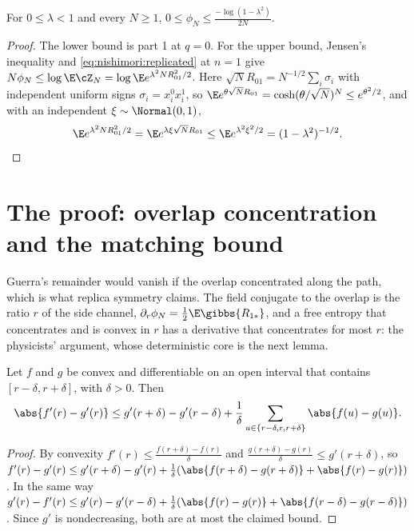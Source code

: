 \begin{refsection}
\begin{proposition}\label{prop:nishimori:below}
For $0\le\lambda<1$ and every $N\ge1$, $\displaystyle0\le\phi_N\le\frac{-\log(1-\lambda^2)}{2N}$.
\end{proposition}

\begin{proof}
The lower bound is part 1 at $q=0$. For the upper bound, Jensen's inequality and \eqref{eq:nishimori:replicated} at $n=1$ give $N\phi_N\le\log\E\cZ_N=\log\E e^{\lambda^2NR_{01}^2/2}$. Here $\sqrt NR_{01}=N^{-1/2}\sum_i\sigma_i$ with independent uniform signs $\sigma_i=x^0_ix^1_i$, so $\E e^{\theta\sqrt NR_{01}}=\cosh(\theta/\sqrt N)^N\le e^{\theta^2/2}$, and with an independent $\xi\sim\Normal(0,1)$,
\[
\E e^{\lambda^2NR_{01}^2/2}=\E e^{\lambda\xi\sqrt NR_{01}}\le\E e^{\lambda^2\xi^2/2}=(1-\lambda^2)^{-1/2}.\qedhere
\]
\end{proof}

\section{The proof: overlap concentration and the matching bound}\label{sec:nishimori:proofmatching}

Guerra's remainder would vanish if the overlap concentrated along the path, which is what replica symmetry claims. The field conjugate to the overlap is the ratio $r$ of the side channel, $\partial_r\phi_N=\frac12\E\gibbs{R_{1*}}$, and a free entropy that concentrates and is convex in $r$ has a derivative that concentrates for most $r$: the physicists' argument, whose deterministic core is the next lemma.

\begin{lemma}\label{lem:nishimori:convex}
Let $f$ and $g$ be convex and differentiable on an open interval that contains $[r-\delta,r+\delta]$, with $\delta>0$. Then
\[
\abs{f'(r)-g'(r)}\le g'(r+\delta)-g'(r-\delta)+\frac1\delta\sum_{u\in\{r-\delta,r,r+\delta\}}\abs{f(u)-g(u)}.
\]
\end{lemma}

\begin{proof}
By convexity $f'(r)\le\frac{f(r+\delta)-f(r)}\delta$ and $\frac{g(r+\delta)-g(r)}\delta\le g'(r+\delta)$, so $f'(r)-g'(r)\le g'(r+\delta)-g'(r)+\frac1\delta(\abs{f(r+\delta)-g(r+\delta)}+\abs{f(r)-g(r)})$. In the same way $g'(r)-f'(r)\le g'(r)-g'(r-\delta)+\frac1\delta(\abs{f(r)-g(r)}+\abs{f(r-\delta)-g(r-\delta)})$. Since $g'$ is nondecreasing, both are at most the claimed bound.
\end{proof}


\end{refsection}
